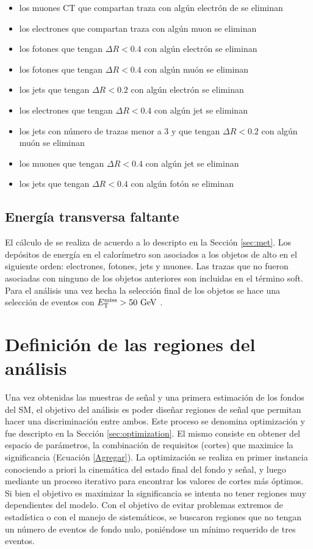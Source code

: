 \begin{itemize}
  \item los muones CT que compartan traza con algún electrón de se eliminan
  \item los electrones que compartan traza con algún muon se eliminan
  \item los fotones que tengan $\Delta R<0.4$ con algún electrón se eliminan
  \item los fotones que tengan $\Delta R<0.4$ con algún muón se eliminan
  \item los jets que tengan $\Delta R<0.2$ con algún electrón se eliminan
  \item los electrones que tengan $\Delta R<0.4$ con algún jet se eliminan
  \item los jets con número de trazas menor a 3 y que tengan $\Delta R<0.2$ con algún muón se eliminan
  \item los muones que tengan $\Delta R<0.4$ con algún jet se eliminan
  \item los jets que tengan $\Delta R<0.4$ con algún fotón se eliminan
\end{itemize}


\subsection{Energía transversa faltante}

El cálculo de \met se realiza de acuerdo a lo descripto en la Sección \ref{sec:met}. Los depósitos de energía en el calorímetro son asociados a los objetos de alto \pt en el siguiente orden: electrones, fotones, jets y muones. Las trazas que no fueron asociadas con ninguno de los objetos anteriores son incluidas en el término soft. Para el análisis una vez hecha la selección final de los objetos se hace una selección de eventos con $\met>50\ \gev$ .


\section{Definición de las regiones del análisis}

Una vez obtenidas las muestras de señal y una primera estimación de los fondos del SM, el objetivo del análisis es poder diseñar regiones de señal que permitan hacer una discriminación entre ambos. Este proceso se denomina optimización y fue descripto en la Sección \ref{sec:optimization}. El mismo consiste en obtener del espacio de parámetros, la combinación de requisitos (cortes) que maximice la significancia (Ecuación \ref{Agregar}). La optimización se realiza en primer instancia conociendo a priori la cinemática del estado final del fondo y señal, y luego mediante un proceso iterativo para encontrar los valores de cortes más óptimos. Si bien el objetivo es maximizar la significancia se intenta no tener regiones muy dependientes del modelo. Con el objetivo de evitar problemas extremos de estadística o con el manejo de sistemáticos, se buscaron regiones que no tengan un número de eventos de fondo nulo, poniéndose un mínimo requerido de tres eventos. 

